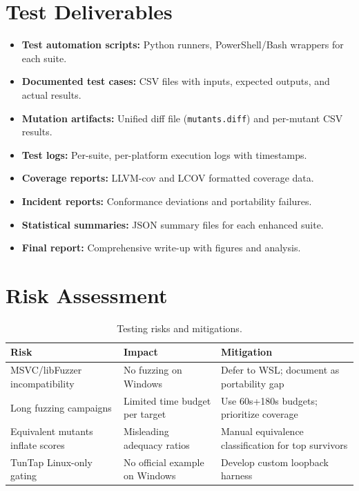 \documentclass[11pt,a4paper]{article}
\begin{document}
\section{Test Deliverables}

\begin{itemize}[noitemsep]
\item \textbf{Test automation scripts:} Python runners, PowerShell/Bash wrappers for each suite.
\item \textbf{Documented test cases:} CSV files with inputs, expected outputs, and actual results.
\item \textbf{Mutation artifacts:} Unified diff file (\texttt{mutants.diff}) and per-mutant CSV results.
\item \textbf{Test logs:} Per-suite, per-platform execution logs with timestamps.
\item \textbf{Coverage reports:} LLVM-cov and LCOV formatted coverage data.
\item \textbf{Incident reports:} Conformance deviations and portability failures.
\item \textbf{Statistical summaries:} JSON summary files for each enhanced suite.
\item \textbf{Final report:} Comprehensive write-up with figures and analysis.
\end{itemize}

\section{Risk Assessment}

\begin{table}[H]
\centering
\caption{Testing risks and mitigations.}
\begin{tabularx}{\textwidth}{lXX}
\toprule
\textbf{Risk} & \textbf{Impact} & \textbf{Mitigation} \\
\midrule
MSVC/libFuzzer incompatibility & No fuzzing on Windows & Defer to WSL; document as portability gap \\
Long fuzzing campaigns & Limited time budget per target & Use 60s+180s budgets; prioritize coverage \\
Equivalent mutants inflate scores & Misleading adequacy ratios & Manual equivalence classification for top survivors \\
TunTap Linux-only gating & No official example on Windows & Develop custom loopback harness \\
\bottomrule
\end{tabularx}
\end{table}
\end{document}

